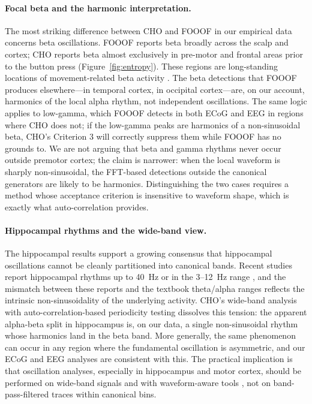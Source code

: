 \documentclass[11pt]{article}
\begin{document}
\paragraph{Focal beta and the harmonic interpretation.}
The most striking difference between CHO and FOOOF in our empirical data concerns beta oscillations. FOOOF reports beta broadly across the scalp and cortex; CHO reports beta almost exclusively in pre-motor and frontal areas prior to the button press (Figure~\ref{fig:entropy}). These regions are long-standing locations of movement-related beta activity \citep{pfurtscheller1999eventrelated,jenkinson2011new}. The beta detections that FOOOF produces elsewhere---in temporal cortex, in occipital cortex---are, on our account, harmonics of the local alpha rhythm, not independent oscillations. The same logic applies to low-gamma, which FOOOF detects in both ECoG and EEG in regions where CHO does not; if the low-gamma peaks are harmonics of a non-sinusoidal beta, CHO's Criterion 3 will correctly suppress them while FOOOF has no grounds to. We are not arguing that beta and gamma rhythms never occur outside premotor cortex; the claim is narrower: when the local waveform is sharply non-sinusoidal, the FFT-based detections outside the canonical generators are likely to be harmonics. Distinguishing the two cases requires a method whose acceptance criterion is insensitive to waveform shape, which is exactly what auto-correlation provides.

\paragraph{Hippocampal rhythms and the wide-band view.}
The hippocampal results support a growing consensus that hippocampal oscillations cannot be cleanly partitioned into canonical bands. Recent studies report hippocampal rhythms up to 40~Hz \citep{cole2019cycle} or in the 3--12~Hz range \citep{cole2017waveform}, and the mismatch between these reports and the textbook theta/alpha ranges \citep{buzsaki2004neuronal} reflects the intrinsic non-sinusoidality of the underlying activity. CHO's wide-band analysis with auto-correlation-based periodicity testing dissolves this tension: the apparent alpha-beta split in hippocampus is, on our data, a single non-sinusoidal rhythm whose harmonics land in the beta band. More generally, the same phenomenon can occur in any region where the fundamental oscillation is asymmetric, and our ECoG and EEG analyses are consistent with this. The practical implication is that oscillation analyses, especially in hippocampus and motor cortex, should be performed on wide-band signals and with waveform-aware tools \citep{donoghue2022methodological,quinn2021within}, not on band-pass-filtered traces within canonical bins.
\end{document}
